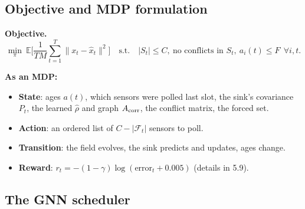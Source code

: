\subsection{Objective and MDP formulation}

\textbf{Objective.}
\[
  \min_\pi\ \mathbb E\Big[\frac{1}{TM}\sum_{t=1}^T\lVert x_t-\hat x_t\rVert^2\Big]
  \quad\text{s.t.}\quad |S_t|\le C,\ \text{no conflicts in } S_t,\ a_i(t)\le F\ \ \forall i,t.
\]

\textbf{As an MDP:}
\begin{itemize}
  \item \textbf{State}: ages $a(t)$, which sensors were polled last slot, the sink's covariance $P_t$, the learned
        $\hat\rho$ and graph $A_{\mathrm{corr}}$, the conflict matrix, the forced set.
  \item \textbf{Action}: an ordered list of $C-|\mathcal F_t|$ sensors to poll.
  \item \textbf{Transition}: the field evolves, the sink predicts and updates, ages change.
  \item \textbf{Reward}: $r_t = -(1-\gamma)\log(\text{error}_t + 0.005)$ (details in 5.9).
\end{itemize}

\subsection{The GNN scheduler}

